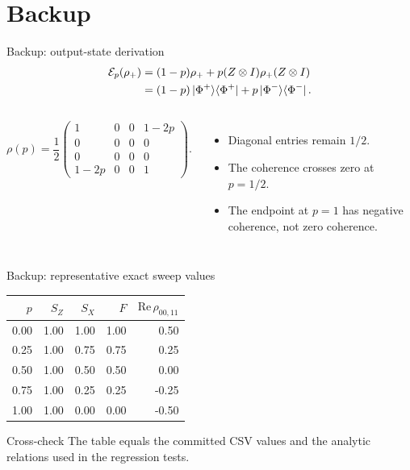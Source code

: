 \documentclass[10pt,aspectratio=169]{beamer}
\newcommand{\sourcefoot}[1]{}
\begin{document}
\appendix
\section{Backup}
\begin{frame}[t]{Backup: output-state derivation}
\begin{align*}
\mathcal E_p(\rho_+)&=(1-p)\rho_+ + p(Z\otimes I)\rho_+(Z\otimes I)\\
&=(1-p)\ket{\Phi^+}\!\bra{\Phi^+}+p\ket{\Phi^-}\!\bra{\Phi^-}.
\end{align*}
\begin{columns}[T]
\[
\rho(p)=\frac12\begin{pmatrix}
1&0&0&1-2p\\0&0&0&0\\0&0&0&0\\1-2p&0&0&1
\end{pmatrix}.
\]
\begin{itemize}
  \item Diagonal entries remain $1/2$.
  \item The coherence crosses zero at $p=1/2$.
  \item The endpoint at $p=1$ has negative coherence, not zero coherence.
\end{itemize}
\end{columns}
\sourcefoot{Full derivation: \texttt{notes/2026-10-29-analytic-phase-flip-record.md} and \texttt{paper/main.tex}.}
\end{frame}

\begin{frame}[t]{Backup: representative exact sweep values}
\centering
\small
\begin{tabular}{@{}rrrrr@{}}
\toprule
$p$ & $S_Z$ & $S_X$ & $F$ & $\mathrm{Re}\,\rho_{00,11}$\\
\midrule
0.00 & 1.00 & 1.00 & 1.00 & 0.50\\
0.25 & 1.00 & 0.75 & 0.75 & 0.25\\
0.50 & 1.00 & 0.50 & 0.50 & 0.00\\
0.75 & 1.00 & 0.25 & 0.25 & -0.25\\
1.00 & 1.00 & 0.00 & 0.00 & -0.50\\
\bottomrule
\end{tabular}
\vspace{5mm}
\begin{block}{Cross-check}
The table equals the committed CSV values and the analytic relations used in the regression tests.
\end{block}
\sourcefoot{\texttt{experiments/phase\_error\_sweep.csv} and \texttt{paper/generated/phase\_error\_results\_table.tex}.}
\end{frame}
\end{document}

